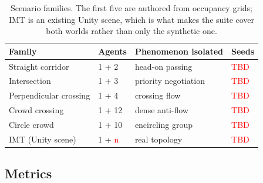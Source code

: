 \documentclass[pdflatex,sn-mathphys-num]{template/sn-jnl}%
\newcommand{\tbd}[1][TBD]{\textcolor{red}{#1}}
\newcommand{\ph}[1]{\textcolor{red}{\langle #1\rangle}}
\begin{document}
\begin{table}[t]
  \centering
  \caption{Scenario families. The first five are authored from occupancy
  grids; IMT is an existing Unity scene, which is what makes the suite cover
  both worlds rather than only the synthetic one.}
  \label{tab:scenarios}
  \begin{tabular}{llll}
    \toprule
    Family & Agents & Phenomenon isolated & Seeds \\
    \midrule
    Straight corridor      & 1 + 2  & head-on passing            & \tbd \\
    Intersection           & 1 + 3  & priority negotiation       & \tbd \\
    Perpendicular crossing & 1 + 4  & crossing flow              & \tbd \\
    Crowd crossing         & 1 + 12 & dense anti-flow            & \tbd \\
    Circle crowd           & 1 + 10 & encircling group           & \tbd \\
    IMT (Unity scene)      & 1 + \ph{n} & real topology          & \tbd \\
    \bottomrule
  \end{tabular}
\end{table}

\subsection{Metrics}
\label{sec:method:metrics}
\end{document}
